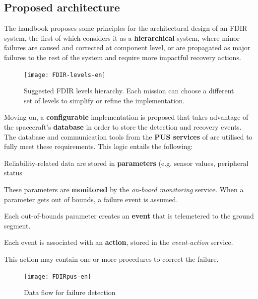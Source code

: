 \documentclass[a4paper,nobib]{tufte-book}
\begin{document}
\subsection{Proposed architecture}

The handbook proposes some principles for the architectural design of an \acs{FDIR} system, the first of which considers it as a \textbf{hierarchical} system, where minor failures are caused and corrected at component level, or are propagated as major failures to the rest of the system and require more impactful recovery actions.

\begin{figure}
	\texttt{[image: FDIR-levels-en]}
	\caption[Suggested FDIR levels hierarchy]{Suggested FDIR levels hierarchy. Each mission can choose a different set of levels to simplify or refine the implementation.}
	\label{fig:FDIR-levels}
\end{figure}

Moving on, a \textbf{configurable} implementation is proposed that takes advantage of the spacecraft's \textbf{database} in order to store the detection and recovery events. The database and communication tools from the \textbf{\acs{PUS} services} of  are utilised to fully meet these requirements. This logic entails the following:
\begin{compactenum}
	\item Reliability-related data are stored in \textbf{parameters} (e.g. sensor values, peripheral status
	\item These parameters are \textbf{monitored} by the \emph{on-board monitoring} service. When a parameter gets out of bounds, a failure event is assumed.
	\item Each out-of-bounds parameter creates an \textbf{event} that is telemetered to the ground segment.
	\item Each event is associated with an \textbf{action}, stored in the \emph{event-action} service.
	\item This action may contain one or more procedures to correct the failure.
\end{compactenum}

\begin{figure}[h]
	\texttt{[image: FDIRpus-en]}
	\caption{Data flow for failure detection}
	\label{fig:fdirpus}
\end{figure}
\end{document}
